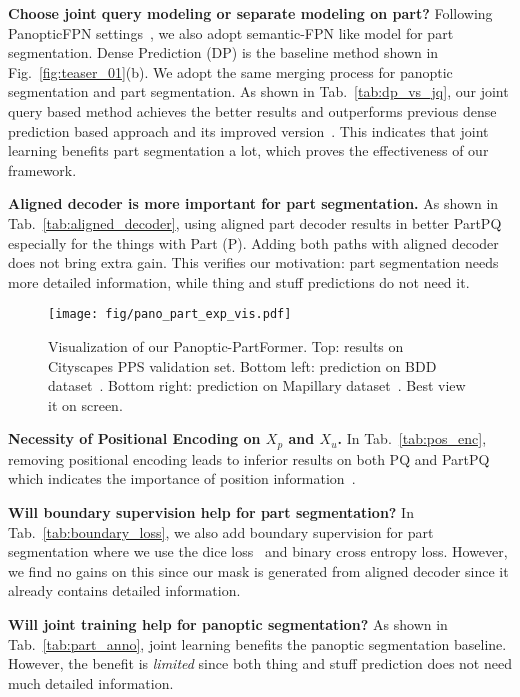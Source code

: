 \noindent
\textbf{Choose joint query modeling or separate modeling on part?} Following PanopticFPN settings~\cite{kirillov2019panopticfpn}, we also adopt semantic-FPN like model for part segmentation. Dense Prediction (DP) is the baseline method shown in Fig.~\ref{fig:teaser_01}(b). We adopt the same merging process for panoptic segmentation and part segmentation. As shown in Tab.~\ref{tab:dp_vs_jq}, our joint query based method achieves the better results and outperforms previous dense prediction based approach and its improved version~\cite{deeplabv3}. This indicates that joint learning benefits part segmentation a lot, which proves the effectiveness of our framework.  

\noindent
\textbf{Aligned decoder is more important for part segmentation.} As shown in Tab.~\ref{tab:aligned_decoder}, using aligned part decoder results in better PartPQ especially for the things with Part (P). Adding both paths with aligned decoder does not bring extra gain. This verifies our motivation: part segmentation needs more detailed information, while thing and stuff predictions do not need it.


\begin{figure*}[t!]
	\centering
	\texttt{[image: fig/pano\_part\_exp\_vis.pdf]}
	\caption{\small Visualization of our Panoptic-PartFormer. Top: results on Cityscapes PPS validation set. Bottom left: prediction on BDD dataset~\cite{yu2020bdd100k}. Bottom right: prediction on Mapillary dataset~\cite{neuhold2017mapillary}. Best view it on screen. }
	\label{fig:exp_vis}
\end{figure*}



\noindent
\textbf{Necessity of Positional Encoding on $X_{p}$ and $X_{u}$.} 
In Tab.~\ref{tab:pos_enc}, removing positional encoding leads to inferior results on both PQ and PartPQ which indicates the importance of position information~\cite{wang2020solov2,zhang2021knet,detr}.

\noindent
\textbf{Will boundary supervision help for part segmentation?} In Tab.~\ref{tab:boundary_loss}, we also add boundary supervision for part segmentation where we use the dice loss~\cite{milletari2016v} and binary cross entropy loss. However, we find no gains on this since our mask is generated from aligned decoder since it already contains detailed information.


\noindent
\textbf{Will joint training help for panoptic segmentation?} As shown in Tab.~\ref{tab:part_anno}, joint learning benefits the panoptic segmentation baseline. However, the benefit is \textit{limited} since both thing and stuff prediction does not need much detailed information. 

